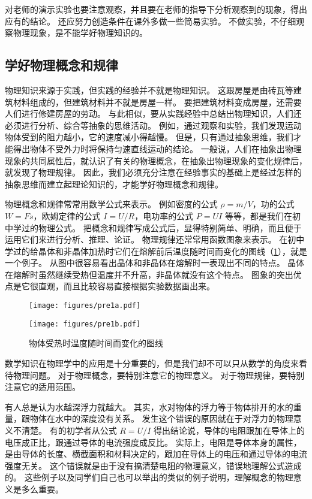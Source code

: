 对老师的演示实验也要注意观察，并且要在老师的指导下分析观察到的现象，得出应有的结论。
还应努力创造条件在课外多做一些简易实验。
不做实验，不仔细观察物理现象，是不能学好物理知识的。

\subsection*{学好物理概念和规律}
物理知识来源于实践，但实践的经验并不就是物理知识。
这跟房屋是由砖瓦等建筑材料组成的，但建筑材料并不就是房屋一样。
要把建筑材料变成房屋，还需要人们进行修建房屋的劳动。
与此相似，要从实践经验中总结出物理知识，人们还必须进行分析、综合等抽象的思维活动。
例如，通过观察和实验，我们发现运动物体受到的阻力越小，它的速度减小得越慢。
但是，只有通过抽象思维，我们才能得出物体不受外力时将保持匀速直线运动的结论。
一般说，人们在抽象出物理现象的共同属性后，就认识了有关的物理概念，在抽象出物理现象的变化规律后，就发现了物理规律。
因此，我们必须充分注意在经验事实的基础上是经过怎样的抽象思维而建立起理论知识的，才能学好物理概念和规律。

物理概念和规律常常用数学公式来表示。
例如密度的公式 $\rho=m/V$，功的公式 $W=Fs$，欧姆定律的公式 $I=U/R$，电功率的公式 $P=UI$ 等等，都是我们在初中学过的物理公式。
把概念和规律写成公式后，显得特别简单、明确，而且便于运用它们来进行分析、推理、论证。
物理规律还常常用函数图象来表示。
在初中学过的给晶体和非晶体加热时它们在熔解前后温度随时间而变化的图线（\cref{fig:1}），就是一个例子。
从图中很容易看出晶体和非晶体在熔解时一表现出不同的特点。
晶体在熔解时虽然继续受热但温度并不升高，非晶体就没有这个特点。
图象的突出优点是它很直观，而且比较容易直接根据实验数据画出来。

\begin{figure}
  \begin{minipage}{0.45\linewidth}\centering
    \texttt{[image: figures/pre1a.pdf]}
    \label{fig:1a}
  \end{minipage}
  \begin{minipage}{0.45\linewidth}\centering
    \texttt{[image: figures/pre1b.pdf]}
    \label{fig:1b}
  \end{minipage}
  \caption{物体受热时温度随时间而变化的图线}\label{fig:1}
\end{figure}

数学知识在物理学中的应用是十分重要的，但是我们却不可以只从数学的角度来看待物理问题。
对于物理概念，要特别注意它的物理意义。
对于物理规律，要特别注意它的适用范围。

有人总是认为水越深浮力就越大。
其实，水对物体的浮力等于物体排开的水的重量，跟物体在水中的深度没有关系。
发生这个错误的原因就在于对浮力的物理意义不清楚。
有的初学者从公式 $R=U/I$ 得出结论说，导体的电阻跟加在导体上的电压成正比，跟通过导体的电流强度成反比。
实际上，电阻是导体本身的属性，是由导体的长度、横截面积和材料决定的，跟加在导体上的电压和通过导体的电流强度无关。
这个错误就是由于没有搞清楚电阻的物理意义，错误地理解公式造成的。
这些例子以及同学们自己也可以举出的类似的例子说明，理解概念的物理意义是多么重要。


